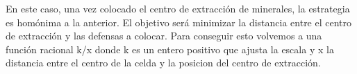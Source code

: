 En este caso, una vez colocado el centro de extracción de minerales, la estrategia es homónima a la anterior. El objetivo será minimizar la distancia entre el centro de extracción y las defensas a colocar. Para conseguir esto volvemos a una función racional k/x donde k es un entero positivo que ajusta la escala y x la distancia entre el centro de la celda y la posicion del centro de extracción.
